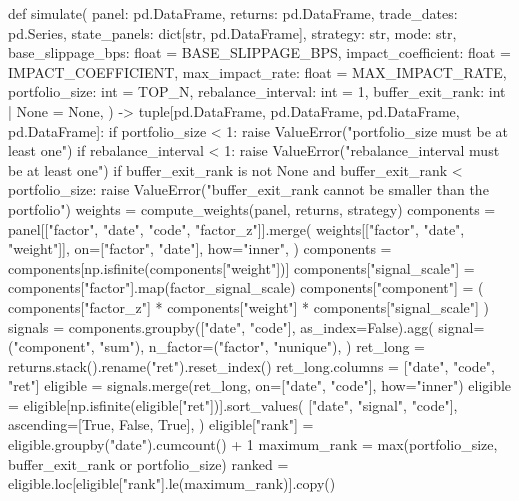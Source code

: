 \documentclass[UTF8,a4paper,fontset=fandol]{ctexart}
\begin{document}
\begin{ProjectCode}
def simulate(
    panel: pd.DataFrame,
    returns: pd.DataFrame,
    trade_dates: pd.Series,
    state_panels: dict[str, pd.DataFrame],
    strategy: str,
    mode: str,
    base_slippage_bps: float = BASE_SLIPPAGE_BPS,
    impact_coefficient: float = IMPACT_COEFFICIENT,
    max_impact_rate: float = MAX_IMPACT_RATE,
    portfolio_size: int = TOP_N,
    rebalance_interval: int = 1,
    buffer_exit_rank: int | None = None,
) -> tuple[pd.DataFrame, pd.DataFrame, pd.DataFrame, pd.DataFrame]:
    if portfolio_size < 1:
        raise ValueError("portfolio_size must be at least one")
    if rebalance_interval < 1:
        raise ValueError("rebalance_interval must be at least one")
    if buffer_exit_rank is not None and buffer_exit_rank < portfolio_size:
        raise ValueError("buffer_exit_rank cannot be smaller than the portfolio")
    weights = compute_weights(panel, returns, strategy)
    components = panel[["factor", "date", "code", "factor_z"]].merge(
        weights[["factor", "date", "weight"]],
        on=["factor", "date"],
        how="inner",
    )
    components = components[np.isfinite(components["weight"])]
    components["signal_scale"] = components["factor"].map(factor_signal_scale)
    components["component"] = (
        components["factor_z"]
        * components["weight"]
        * components["signal_scale"]
    )
    signals = components.groupby(["date", "code"], as_index=False).agg(
        signal=("component", "sum"),
        n_factor=("factor", "nunique"),
    )
    ret_long = returns.stack().rename("ret").reset_index()
    ret_long.columns = ["date", "code", "ret"]
    eligible = signals.merge(ret_long, on=["date", "code"], how="inner")
    eligible = eligible[np.isfinite(eligible["ret"])].sort_values(
        ["date", "signal", "code"],
        ascending=[True, False, True],
    )
    eligible["rank"] = eligible.groupby("date").cumcount() + 1
    maximum_rank = max(portfolio_size, buffer_exit_rank or portfolio_size)
    ranked = eligible.loc[eligible["rank"].le(maximum_rank)].copy()


\end{ProjectCode}
\end{document}
